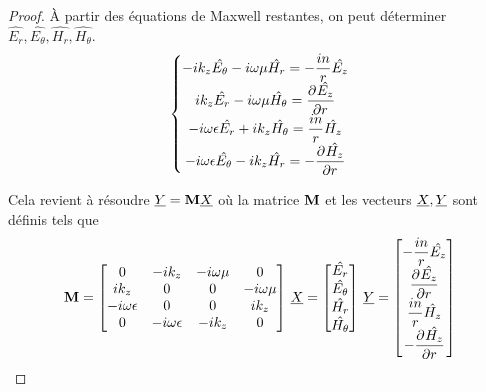     \begin{proof}
        À partir des équations de Maxwell restantes, on peut déterminer $\hat{E_r},\hat{E_\theta},\hat{H_r},\hat{H_\theta}$.
        \begin{equation}
            \left\lbrace
            \begin{matrix}
                -ik_z\hat{E_\theta} - i\w\mu \hat{H_r} = -\frac{in}{r}\hat{E_z}
                \\
                ik_z\hat{E_r} - i\w\mu \hat{H_\theta} = \ddr{r}{\hat{E_z}}
                \\
                -i\w\eps \hat{E_r} + ik_z \hat{H_\theta} = \frac{in}{r}\hat{H_z}
                \\
                -i\w\eps \hat{E_\theta} - ik_z \hat{H_r} = -\ddr{r}{\hat{H_z}}
            \end{matrix}
            \right.
        \end{equation}

        Cela revient à résoudre $\v{Y} = \mat{M}\v{X}$ où la matrice $\mat{M}$ et les vecteurs $\v{X}, \v{Y}$ sont définis tels que
        \begin{equation}
            \mat{M} =
            \begin{bmatrix}
            0 & -ik_z & -i\w\mu & 0 
            \\
            ik_z & 0 & 0 & -i\w\mu
            \\
            -i\w\eps & 0 & 0 & ik_z
            \\
            0 & -i\w\eps & -ik_z & 0
            \end{bmatrix}
            \,
            \v{X} = 
            \begin{bmatrix}
                \hat{E_r}\\
                \hat{E_\theta}\\
                \hat{H_r}\\
                \hat{H_\theta}
            \end{bmatrix}
            \,
            \v{Y} = 
            \begin{bmatrix}
                -\frac{in}{r}\hat{E_z}\\
                \ddr{r}{\hat{E_z}}\\
                \frac{in}{r}\hat{H_z}\\
                -\ddr{r}{\hat{H_z}}
            \end{bmatrix}
        \end{equation}


\end{proof}
